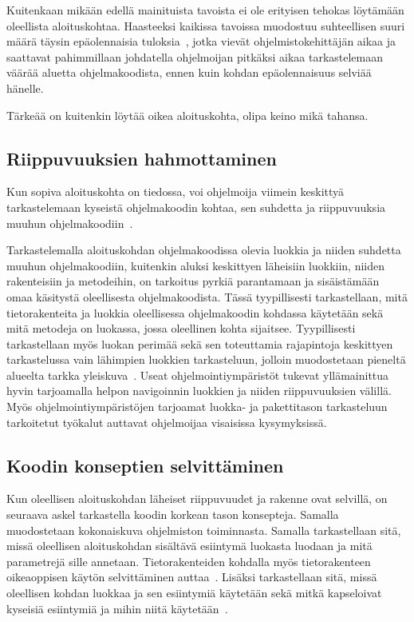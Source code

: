 \documentclass[finnish]{tktltiki2}
\theoremstyle{definition}
\theoremstyle{remark}
\begin{document}
Kuitenkaan mikään edellä mainituista tavoista ei ole erityisen tehokas löytämään oleellista aloituskohtaa. Haasteeksi kaikissa tavoissa muodostuu suhteellisen suuri määrä täysin epäolennaisia tuloksia~\cite{eliciting-design-requirements-for-maintenance-oriented-ides}, jotka vievät ohjelmistokehittäjän aikaa ja saattavat pahimmillaan johdatella ohjelmoijan pitkäksi aikaa tarkastelemaan väärää aluetta ohjelmakoodista, ennen kuin kohdan epäolennaisuus selviää hänelle.

Tärkeää on kuitenkin löytää oikea aloituskohta, olipa keino mikä tahansa.

\subsection{Riippuvuuksien hahmottaminen}
Kun sopiva aloituskohta on tiedossa, voi ohjelmoija viimein keskittyä tarkastelemaan kyseistä ohjelmakoodin kohtaa, sen suhdetta ja riippuvuuksia muuhun ohjelmakoodiin~\cite{questions-during-software-evolution-tasks}.

Tarkastelemalla aloituskohdan ohjelmakoodissa olevia luokkia ja niiden suhdetta muuhun ohjelmakoodiin, kuitenkin aluksi keskittyen läheisiin luokkiin, niiden rakenteisiin ja metodeihin, on tarkoitus pyrkiä parantamaan ja sisäistämään omaa käsitystä oleellisesta ohjelmakoodista. Tässä tyypillisesti tarkastellaan, mitä tietorakenteita ja luokkia oleellisessa ohjelmakoodin kohdassa käytetään sekä mitä metodeja on luokassa, jossa oleellinen kohta sijaitsee. Tyypillisesti tarkastellaan myös luokan perimää sekä sen toteuttamia rajapintoja keskittyen tarkastelussa vain lähimpien luokkien tarkasteluun, jolloin muodostetaan pieneltä alueelta tarkka yleiskuva~\cite{questions-during-software-evolution-tasks}.
Useat ohjelmointiympäristöt tukevat yllämainittua hyvin tarjoamalla helpon navigoinnin luokkien ja niiden riippuvuuksien välillä. Myös ohjelmointiympäristöjen tarjoamat luokka- ja pakettitason tarkasteluun tarkoitetut työkalut auttavat ohjelmoijaa visaisissa kysymyksissä.

\subsection{Koodin konseptien selvittäminen}
Kun oleellisen aloituskohdan läheiset riippuvuudet ja rakenne ovat selvillä, on seuraava askel tarkastella koodin korkean tason konsepteja. Samalla muodostetaan kokonaiskuva ohjelmiston toiminnasta. Samalla tarkastellaan sitä, missä oleellisen aloituskohdan sisältävä esiintymä luokasta luodaan ja mitä parametrejä sille annetaan. Tietorakenteiden kohdalla myös tietorakenteen oikeaoppisen käytön selvittäminen auttaa~\cite{eliciting-design-requirements-for-maintenance-oriented-ides}. Lisäksi tarkastellaan sitä, missä oleellisen kohdan luokkaa ja sen esiintymiä käytetään sekä mitkä kapseloivat kyseisiä esiintymiä ja mihin niitä käytetään~\cite{questions-during-software-evolution-tasks}.
\end{document}
